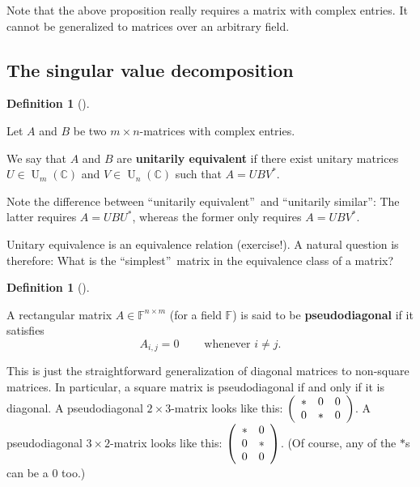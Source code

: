 \documentclass[numbers=enddot,12pt,final,onecolumn,notitlepage]{scrartcl}%
\newcounter{exer}
\numberwithin{exer}{subsection}
\theoremstyle{definition}
\newtheorem{defi}[theo]{Definition}
\newenvironment{definition}[1][]
{\begin{defi}[#1]\begin{leftbar}}
{\end{leftbar}\end{defi}}
\begin{document}
Note that the above proposition really requires a matrix with complex entries.
It cannot be generalized to matrices over an arbitrary field.

\subsection{The singular value decomposition}

\begin{definition}
Let $A$ and $B$ be two $m\times n$-matrices with complex entries.

We say that $A$ and $B$ are \textbf{unitarily equivalent} if there exist
unitary matrices $U\in\operatorname*{U}\nolimits_{m}\left(  \mathbb{C}\right)
$ and $V\in\operatorname*{U}\nolimits_{n}\left(  \mathbb{C}\right)  $ such
that $A=UBV^{\ast}$.
\end{definition}

Note the difference between \textquotedblleft unitarily
equivalent\textquotedblright\ and \textquotedblleft unitarily
similar\textquotedblright: The latter requires $A=UBU^{\ast}$, whereas the
former only requires $A=UBV^{\ast}$.

Unitary equivalence is an equivalence relation (exercise!). A natural question
is therefore: What is the \textquotedblleft simplest\textquotedblright\ matrix
in the equivalence class of a matrix?

\begin{definition}
A rectangular matrix $A\in\mathbb{F}^{n\times m}$ (for a field $\mathbb{F}$)
is said to be \textbf{pseudodiagonal} if it satisfies%
\[
A_{i,j}=0\ \ \ \ \ \ \ \ \ \ \text{whenever }i\neq j.
\]

\end{definition}

This is just the straightforward generalization of diagonal matrices to
non-square matrices. In particular, a square matrix is pseudodiagonal if and
only if it is diagonal. A pseudodiagonal $2\times3$-matrix looks like this:
$\left(
\begin{array}
[c]{ccc}%
\ast & 0 & 0\\
0 & \ast & 0
\end{array}
\right)  $. A pseudodiagonal $3\times2$-matrix looks like this: $\left(
\begin{array}
[c]{cc}%
\ast & 0\\
0 & \ast\\
0 & 0
\end{array}
\right)  $. (Of course, any of the $\ast$s can be a $0$ too.)
\end{document}

